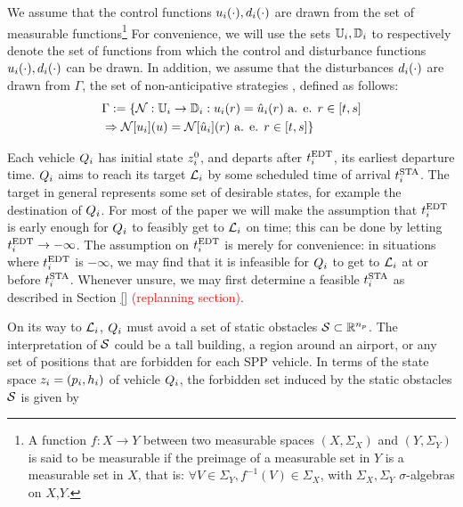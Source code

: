 We assume that the control functions $u_i(\cdot), d_i(\cdot)$ are drawn from the set of measurable functions\footnote{
A function $f:X\to Y$ between two measurable spaces $(X,\Sigma_X)$ and $(Y,\Sigma_Y)$ is said to be measurable if the preimage of a measurable set in $Y$ is a measurable set in $X$, that is: $\forall V\in\Sigma_Y, f^{-1}(V)\in\Sigma_X$, with $\Sigma_X,\Sigma_Y$ $\sigma$-algebras on $X$,$Y$.} For convenience, we will use the sets $\mathbb{U}_i, \mathbb{D}_i$ to respectively denote the set of functions from which the control and disturbance functions $u_i(\cdot), d_i(\cdot)$ can be drawn. In addition, we assume that the disturbances $d_i(\cdot)$ are drawn from $\Gamma$, the set of non-anticipative strategies \cite{Mitchell05}, defined as follows:
\begin{equation}
\begin{aligned}
& \Gamma := \{\mathcal{N}: \mathbb{U}_i \rightarrow \mathbb{D}_i:  u_i(r) = \hat{u}_i(r) \text{ a. e. } r\in[t,s] \\
& \Rightarrow \mathcal{N}[u_i](u) = \mathcal{N}[\hat{u}_i](r) \text{ a. e. } r\in[t,s]\}
\end{aligned}
\end{equation}

Each vehicle $Q_i$ has initial state $z^0_i$, and departs after $t^\text{EDT}_i$, its earliest departure time. $Q_i$ aims to reach its target $\mathcal{L}_i$ by some scheduled time of arrival $t^\text{STA}_i$. The target in general represents some set of desirable states, for example the destination of $Q_i$. For most of the paper we will make the assumption that $t^\text{EDT}_i$ is early enough for $Q_i$ to feasibly get to $\mathcal{L}_i$ on time; this can be done by letting $t^\text{EDT}_i \rightarrow -\infty$. The assumption on $t^\text{EDT}_i$ is merely for convenience: in situations where $t^\text{EDT}_i$ is $-\infty$, we may find that it is infeasible for $Q_i$ to get to $\mathcal{L}_i$ at or before $t^\text{STA}_i$. Whenever unsure, we may first determine a feasible $t^\text{STA}_i$ as described in Section \ref{} \textcolor{red}{(replanning section)}. 

On its way to $\mathcal{L}_i$, $Q_i$ must avoid a set of static obstacles $\mathcal{S} \subset \mathbb{R}^{n_p}$. The interpretation of $\mathcal{S}$ could be a tall building, a region around an airport, or any set of positions that are forbidden for each SPP vehicle. In terms of the state space $z_i = (p_i, h_i)$ of vehicle $Q_i$, the forbidden set induced by the static obstacles $\mathcal{S}$ is given by

